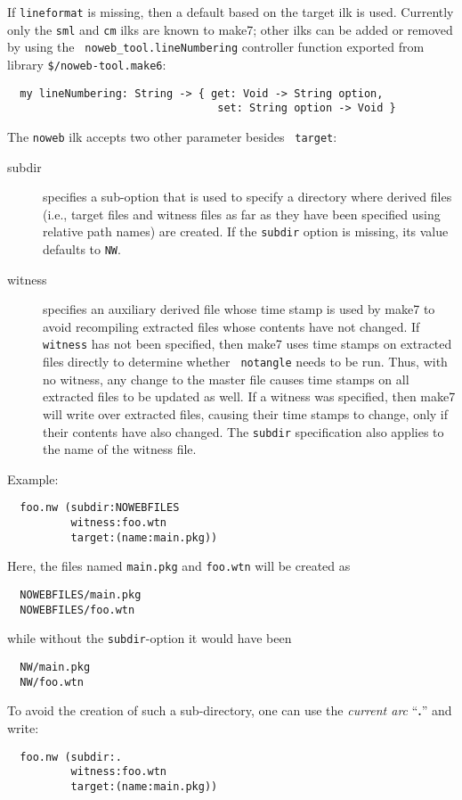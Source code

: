 If {\tt lineformat} is missing, then a default based on the target
ilk is used.  Currently only the {\tt sml} and {\tt cm} ilks are
known to make7; other ilks can be added or removed by using the {\tt
noweb_tool.lineNumbering} controller function exported from library
{\tt \$/noweb-tool.make6}:

\begin{verbatim}
  my lineNumbering: String -> { get: Void -> String option,
                                 set: String option -> Void }
\end{verbatim}

The {\tt noweb} ilk accepts two other parameter besides {\tt
target}:

\begin{description}
\item[subdir] specifies a sub-option that is used to specify a
directory where derived files (i.e., target files and witness files as
far as they have been specified using relative path names) are
created.  If the {\tt subdir} option is missing, its value defaults to
{\tt NW}.
\item[witness] specifies an auxiliary derived file whose time stamp is
used by make7 to avoid recompiling extracted files whose contents have
not changed.  If {\tt witness} has not been specified, then make7 uses
time stamps on extracted files directly to determine whether {\tt
notangle} needs to be run.  Thus, with no witness, any change to the
master file causes time stamps on all extracted files to be updated as
well.  If a witness was specified, then make7 will write over extracted
files, causing their time stamps to change, only if their contents
have also changed.  The {\tt subdir} specification also applies to the
name of the witness file.
\end{description}

Example:

\begin{verbatim}
  foo.nw (subdir:NOWEBFILES
          witness:foo.wtn
          target:(name:main.pkg))
\end{verbatim}

Here, the files named {\tt main.pkg} and {\tt foo.wtn} will be
created as
\begin{verbatim}
  NOWEBFILES/main.pkg
  NOWEBFILES/foo.wtn
\end{verbatim}
\noindent while without the {\tt subdir}-option it would have been
\begin{verbatim}
  NW/main.pkg
  NW/foo.wtn
\end{verbatim}
\noindent To avoid the creation of such a sub-directory, one can use
the {\em current arc} ``{\bf .}'' and write:
\begin{verbatim}
  foo.nw (subdir:.
          witness:foo.wtn
          target:(name:main.pkg))
\end{verbatim}

